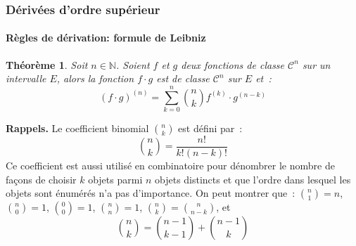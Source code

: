 \documentclass[10pt,notheorems]{beamer}
\theoremstyle{plain}
\newtheorem{theorem}{Théorème}
\theoremstyle{definition} %
\begin{document}
\begin{frame}
  \frametitle{Dérivées d'ordre supérieur}
  \framesubtitle{Règles de dérivation: formule de Leibniz}
  \hypertarget{slide_derivees_ordre_n_4}{}

  \begin{theorem}\label{thm:leibniz}
    Soit $n\in\mathbb N$. Soient $f$ et $g$ deux fonctions de classe
    $\mathcal C^n$ sur un intervalle $E$, alors la fonction $f\cdot g$
    est de classe $\mathcal C^n$ sur $E$ et~:
    \[
      (f\cdot g)^{(n)} = \sum_{k=0}^n \binom{n}{k}f^{(k)}\cdot g^{(n-k)}
    \]
  \end{theorem}

  \bigskip

  {\textbf{Rappels.}} Le coefficient binomial $\binom{n}{k}$ est défini par~:
  \[
    \binom{n}{k} = \frac{n!}{k!(n-k)!}
  \]
  Ce coefficient est aussi utilisé en combinatoire pour dénombrer le
  nombre de façons de choisir $k$ objets parmi $n$ objets distincts et
  que l'ordre dans lesquel les objets sont énumérés n'a pas
  d'importance. On peut montrer que~: $\binom{n}{1} = n$, $\binom{n}{0} = 1$, $\binom{0}{0} = 1$, $\binom{n}{n} = 1$, $\binom{n}{k} = \binom{n}{n-k}$, et
  \[
    \binom{n}{k} = \binom{n-1}{k-1} + \binom{n-1}{k}
  \]

\end{frame}
\end{document}
